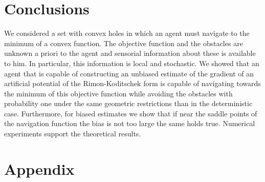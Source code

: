 \documentclass[article]{IEEEtran}
\theoremstyle{definition}
\begin{document}
\section{Conclusions}\label{sec_conclusion}
We considered a set with convex holes in which an agent must navigate to the minimum of a convex function. The objective function and the obstacles are unknown a priori to the agent and sensorial information about these is available to him. In particular, this information is local and stochastic. We showed that an agent that is capable of constructing an unbiased estimate of the gradient of an artificial potential of the Rimon-Koditschek form is capable of navigating towards the minimum of this objective function while avoiding the obstacles with probability one under the same geometric restrictions than in the deterministic case. Furthermore, for biased estimates we show that if near the saddle points of the navigation function the bias is not too large the same holds true. Numerical experiments support the theoretical results.
%
\appendix
\section{Appendix}
\end{document}
